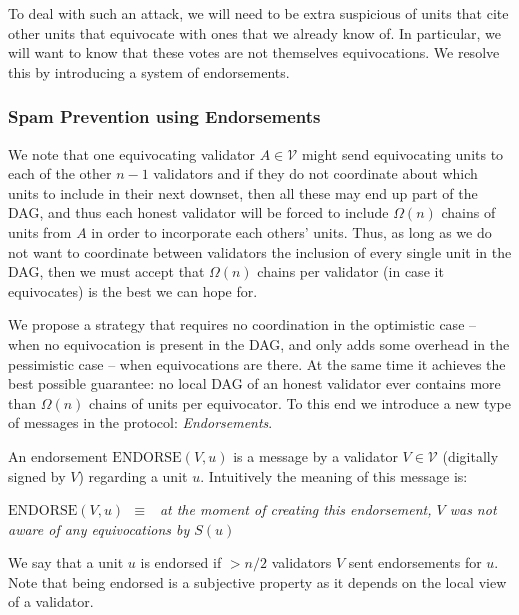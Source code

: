 \documentclass[12pt, fleqn]{article}
\newcommand{\eendorse}{\mathrm{ENDORSE}}
\newcommand{\cV}{\mathcal{V}}
\begin{document}
To deal with such an attack, we will need to be extra suspicious of units that cite other units that equivocate with ones that we already know of.
%
In particular, we will want to know that these votes are not themselves equivocations.
%
We resolve this by introducing a system of endorsements.


\subsubsection{Spam Prevention using Endorsements}\label{sec:endorse}
We note that one equivocating validator $A\in \cV$ might send equivocating units to each of the other $n-1$ validators and if they do not coordinate about which units to include in their next downset, then all these may end up part of the DAG, and thus each honest validator will be forced to include $\Omega(n)$ chains of units from $A$ in order to incorporate each others' units.
%
Thus, as long as we do not want to coordinate between validators the inclusion of every single unit in the DAG, then we must accept that $\Omega(n)$ chains per validator (in case it equivocates) is the best we can hope for.
%

We propose a strategy that requires no coordination in the optimistic case -- when no equivocation is present in the DAG, and only adds some overhead in the pessimistic case -- when equivocations are there.
%
At the same time it achieves the best possible guarantee: no local DAG of an honest validator ever contains more than $\Omega(n)$ chains of units per equivocator.
%
To this end we introduce a new type of messages in the protocol: {\it Endorsements}.
%

An endorsement $\eendorse(V, u)$ is a message by a validator $V\in \cV$ (digitally signed by $V$) regarding a unit $u$.
%
Intuitively the meaning of this message is:
\begin{center}
    $\eendorse(V, u) ~~\equiv ~~$ {\it at the moment of creating this endorsement, $V$ was not aware of any equivocations by $S(u)$}
\end{center}
%
We say that a unit $u$ is endorsed if $>n/2$ validators $V$ sent endorsements for $u$.
%
Note that being endorsed is a subjective property as it depends on the local view of a validator.
%
\end{document}
